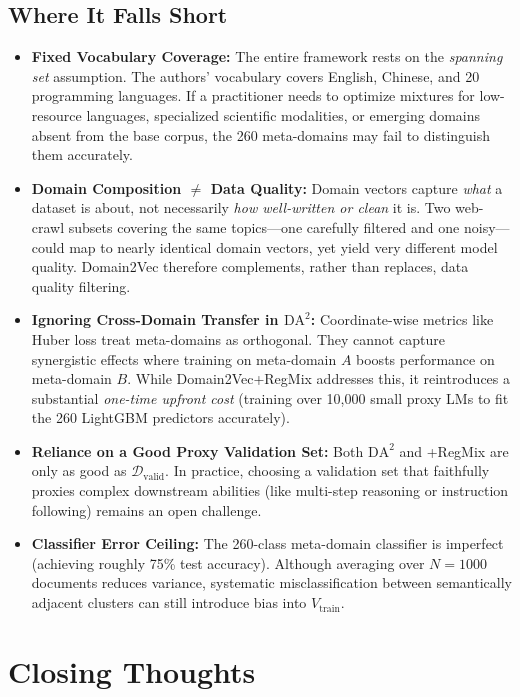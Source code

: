 \documentclass[12pt]{article}
\begin{document}
\subsection*{Where It Falls Short}
\begin{itemize}
    \item \textbf{Fixed Vocabulary Coverage:} The entire framework rests on the \emph{spanning set} assumption. The authors' vocabulary covers English, Chinese, and 20 programming languages. If a practitioner needs to optimize mixtures for low-resource languages, specialized scientific modalities, or emerging domains absent from the base corpus, the 260 meta-domains may fail to distinguish them accurately.
    \item \textbf{Domain Composition $\neq$ Data Quality:} Domain vectors capture \emph{what} a dataset is about, not necessarily \emph{how well-written or clean} it is. Two web-crawl subsets covering the same topics—one carefully filtered and one noisy—could map to nearly identical domain vectors, yet yield very different model quality. Domain2Vec therefore complements, rather than replaces, data quality filtering.
    \item \textbf{Ignoring Cross-Domain Transfer in $\mathrm{DA}^2$:} Coordinate-wise metrics like Huber loss treat meta-domains as orthogonal. They cannot capture synergistic effects where training on meta-domain $A$ boosts performance on meta-domain $B$. While Domain2Vec+RegMix addresses this, it reintroduces a substantial \emph{one-time upfront cost} (training over 10,000 small proxy LMs to fit the 260 LightGBM predictors accurately).
    \item \textbf{Reliance on a Good Proxy Validation Set:} Both $\mathrm{DA}^2$ and +RegMix are only as good as $\mathcal{D}_{\text{valid}}$. In practice, choosing a validation set that faithfully proxies complex downstream abilities (like multi-step reasoning or instruction following) remains an open challenge.
    \item \textbf{Classifier Error Ceiling:} The 260-class meta-domain classifier is imperfect (achieving roughly 75\% test accuracy). Although averaging over $N=1000$ documents reduces variance, systematic misclassification between semantically adjacent clusters can still introduce bias into $V_{\text{train}}$.
\end{itemize}

\section*{Closing Thoughts}
\end{document}
